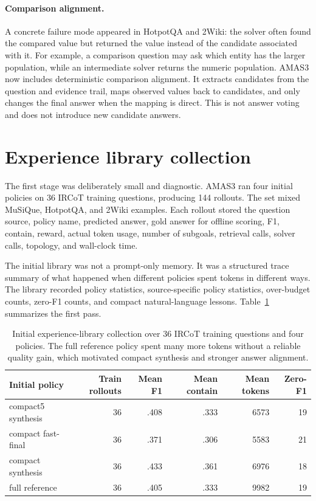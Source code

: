 \documentclass[10pt]{article}
\begin{document}
\paragraph{Comparison alignment.}
A concrete failure mode appeared in HotpotQA and 2Wiki: the solver often found the compared value but returned the value instead of the candidate associated with it. For example, a comparison question may ask which entity has the larger population, while an intermediate solver returns the numeric population. AMAS3 now includes deterministic comparison alignment. It extracts candidates from the question and evidence trail, maps observed values back to candidates, and only changes the final answer when the mapping is direct. This is not answer voting and does not introduce new candidate answers.

\section{Experience library collection}

The first stage was deliberately small and diagnostic. AMAS3 ran four initial policies on 36 IRCoT training questions, producing 144 rollouts. The set mixed MuSiQue, HotpotQA, and 2Wiki examples. Each rollout stored the question source, policy name, predicted answer, gold answer for offline scoring, F1, contain, reward, actual token usage, number of subgoals, retrieval calls, solver calls, topology, and wall-clock time.

The initial library was not a prompt-only memory. It was a structured trace summary of what happened when different policies spent tokens in different ways. The library recorded policy statistics, source-specific policy statistics, over-budget counts, zero-F1 counts, and compact natural-language lessons. Table~\ref{tab:library} summarizes the first pass.

\begin{table}[H]
\centering
\small
\begin{tabular}{lrrrrr}
\toprule
Initial policy & Train rollouts & Mean F1 & Mean contain & Mean tokens & Zero-F1 \\
\midrule
compact5 synthesis & 36 & .408 & .333 & 6573 & 19 \\
compact fast-final & 36 & .371 & .306 & 5583 & 21 \\
compact synthesis & 36 & .433 & .361 & 6976 & 18 \\
full reference & 36 & .405 & .333 & 9982 & 19 \\
\bottomrule
\end{tabular}
\caption{Initial experience-library collection over 36 IRCoT training questions and four policies. The full reference policy spent many more tokens without a reliable quality gain, which motivated compact synthesis and stronger answer alignment.}
\label{tab:library}
\end{table}
\end{document}
